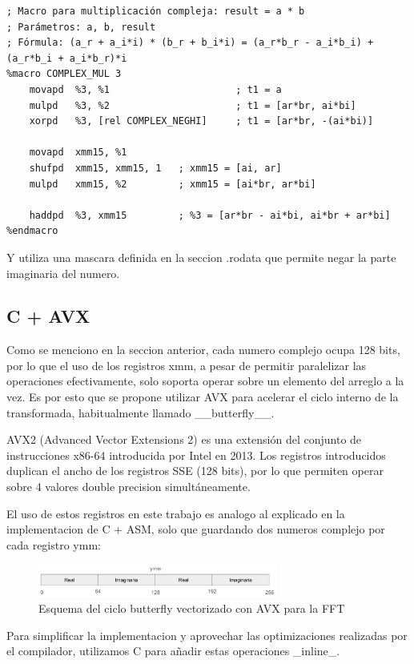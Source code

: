 \documentclass[a4paper]{article}
\begin{document}
\begin{verbatim}
; Macro para multiplicación compleja: result = a * b
; Parámetros: a, b, result
; Fórmula: (a_r + a_i*i) * (b_r + b_i*i) = (a_r*b_r - a_i*b_i) + (a_r*b_i + a_i*b_r)*i
%macro COMPLEX_MUL 3
    movapd  %3, %1                      ; t1 = a
    mulpd   %3, %2                      ; t1 = [ar*br, ai*bi]
    xorpd   %3, [rel COMPLEX_NEGHI]     ; t1 = [ar*br, -(ai*bi)]

    movapd  xmm15, %1
    shufpd  xmm15, xmm15, 1   ; xmm15 = [ai, ar]
    mulpd   xmm15, %2         ; xmm15 = [ai*br, ar*bi]

    haddpd  %3, xmm15         ; %3 = [ar*br - ai*bi, ai*br + ar*bi]
%endmacro
\end{verbatim}

Y utiliza una mascara definida en la seccion .rodata que permite negar la parte imaginaria del numero.

\subsection{C + AVX}
Como se menciono en la seccion anterior, cada numero complejo ocupa 128 bits, por lo que el uso de los registros xmm, a pesar de permitir paralelizar las operaciones
efectivamente, solo soporta operar sobre un elemento del arreglo a la vez. Es por esto que se propone utilizar AVX para acelerar el ciclo interno de la transformada,
habitualmente llamado __butterfly__.

AVX2 (Advanced Vector Extensions 2) es una extensión del conjunto de instrucciones x86-64 introducida por Intel en 2013. Los registros introducidos duplican el ancho
de los registros SSE (128 bits), por lo que permiten operar sobre 4 valores double precision simultáneamente.

El uso de estos registros en este trabajo es analogo al explicado en la implementacion de C + ASM, solo que guardando dos numeros complejo por cada registro ymm:

\begin{figure}[h]
    \centering
    \includegraphics[width=0.7\textwidth]{extra/ymm complex.png}
    \caption{Esquema del ciclo butterfly vectorizado con AVX para la FFT}
    \label{fig:avx_butterfly}
\end{figure}

Para simplificar la implementacion y aprovechar las optimizaciones realizadas por el compilador, utilizamos C para añadir estas operaciones _inline_.
\end{document}
